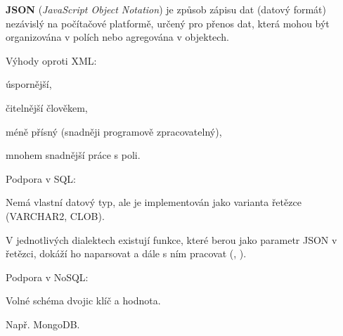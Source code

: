 \begin{compactitem}
    \item \textbf{JSON} (\textit{JavaScript Object Notation}) je způsob zápisu dat (datový formát) nezávislý na počítačové platformě, určený pro přenos dat, která mohou být organizována v polích nebo agregována v objektech.

    \item Výhody oproti XML: \begin{compactitem}
        \item úspornější,
        \item čitelnější člověkem,
        \item méně přísný (snadněji programově zpracovatelný),
        \item mnohem snadnější práce s poli.
    \end{compactitem}

    \item Podpora v SQL: \begin{compactitem}
        \item Nemá vlastní datový typ, ale je implementován jako varianta řetězce (VARCHAR2, CLOB).
        \item V jednotlivých dialektech existují funkce, které berou jako parametr JSON v řetězci, dokáží ho naparsovat a dále s ním pracovat (, ).
    \end{compactitem}

    \item Podpora v NoSQL: \begin{compactitem}
        \item Volné schéma dvojic klíč a hodnota.
        \item Např. MongoDB.
    \end{compactitem}
\end{compactitem}
